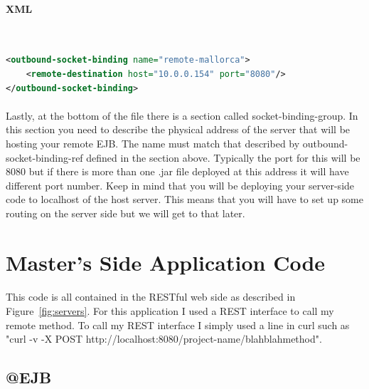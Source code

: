 \documentclass[
10pt, %
letterpaper, %
oneside, %
headinclude,footinclude, %
BCOR5mm, %
]{scrartcl}
\begin{document}
\paragraph{XML}~
\begin{lstlisting}[language=XML]
<outbound-socket-binding name="remote-mallorca">
	<remote-destination host="10.0.0.154" port="8080"/>
</outbound-socket-binding>
\end{lstlisting}

\paragraph{} Lastly, at the bottom of the file there is a section called socket-binding-group. In this section you need to describe the physical address of the server that will be hosting your remote EJB. The name must match that described by outbound-socket-binding-ref defined in the section above. Typically the port for this will be 8080 but if there is more than one .jar file deployed at this address it will have different port number. Keep in mind that you will be deploying your server-side code to localhost of the host server. This means that you will have to set up some routing on the server side but we will get to that later.



\section{Master's Side Application Code}


\paragraph{} This code is all contained in the RESTful web side as described in Figure~\ref{fig:servers}. For this application I used a REST interface to call my remote method. To call my REST interface I simply used a line in curl such as "curl -v -X POST http://localhost:8080/project-name/blahblahmethod".


\subsection{@EJB}
\end{document}
